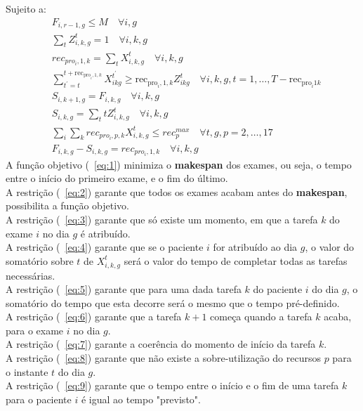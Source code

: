 Sujeito a:
\begin{align}
&F_{i,r-1,g} \leq M \quad \forall i,g \label{eq:2} \\
&\sum_{t}Z^{t}_{i,k,g} = 1 \quad \forall i,k,g \label{eq:3} \\
&rec_{pro_{i},1,k} = \sum_{t}X^{t}_{i,k,g} \quad \forall i,k,g \label{eq:4} \\
&\sum^{t+\text{rec}_{\text{pro}_{i},1,k}}_{t^{'}=t}X^{t^{'}}_{ikg} \geq \text{rec}_{\text{pro}_{i},1,k}Z^{t}_{ikg} \quad \forall i,k,g,t=1, \ldots,T-\text{rec}_{\text{pro}_{i}1k} \label{eq:5} \\
&S_{i,k+1,g} = F_{i,k,g} \quad \forall i,k,g \label{eq:6} \\
&S_{i,k,g} = \sum_{t}tZ^{t}_{i,k,g} \quad \forall i,k,g \label{eq:7} \\
&\sum_{i}\sum_{k}rec_{pro_{i},p,k}X^{t}_{i,k,g} \leq rec^{max}_{p} \quad \forall t,g,p=2, \ldots, 17 \label{eq:8} \\
&F_{i,k,g} - S_{i,k,g} = rec_{pro_{i},1,k} \quad \forall i,k,g \label{eq:9}
\end{align}
A função objetivo (~\ref{eq:1}) minimiza o \textbf{makespan} dos exames, ou seja, o tempo entre o início do primeiro exame, e o fim do último.\\
A restrição (~\ref{eq:2}) garante que todos os exames acabam antes do \textbf{makespan}, possibilita a função objetivo.\\
A restrição (~\ref{eq:3}) garante que só existe um momento, em que a tarefa $k$ do exame $i$ no dia $g$ é atribuído.\\
A restrição (~\ref{eq:4}) garante que se o paciente $i$ for atribuído ao dia $g$, o valor do somatório sobre $t$ de $X^{t}_{i,k,g}$ será o valor do tempo de completar todas as tarefas necessárias.\\
A restrição (~\ref{eq:5}) garante que para uma dada tarefa $k$ do paciente $i$ do dia $g$, o somatório do tempo que esta decorre será o mesmo que o tempo pré-definido.\\
A restrição (~\ref{eq:6}) garante que a tarefa $k+1$ começa quando a tarefa $k$ acaba, para o exame $i$ no dia $g$.\\
A restrição (~\ref{eq:7}) garante a coerência do momento de início da tarefa $k$.\\
A restrição (~\ref{eq:8}) garante que não existe a sobre-utilização do recursos $p$ para o instante $t$ do dia $g$.\\
A restrição (~\ref{eq:9}) garante que o tempo entre o início e o fim de uma tarefa $k$ para o paciente $i$ é igual ao tempo "previsto".\\


